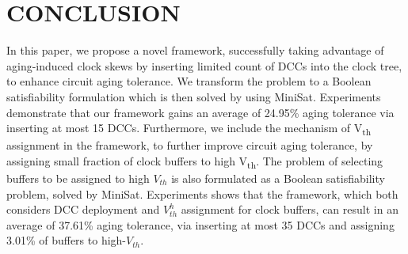 \section{CONCLUSION}
\label{sec:conclude}
In this paper, we propose a novel framework, successfully taking advantage of aging-induced clock skews by inserting limited count of DCCs into the clock tree, to enhance circuit aging tolerance. We transform the problem to a Boolean satisfiability formulation which is then solved by using MiniSat. Experiments demonstrate that our framework gains an average of 24.95\% aging tolerance via inserting at most 15 DCCs. Furthermore, we include the mechanism of V\textsubscript{th} assignment in the framework, to further improve circuit aging tolerance, by assigning small fraction of clock buffers to high V\textsubscript{th}. The problem of selecting buffers to be assigned to high $V_{th}$ is also formulated as a Boolean satisfiability problem, solved by MiniSat. Experiments shows that the framework, which both considers DCC deployment and $V_{th}^h$ assignment for clock buffers, can result in an average of 37.61\% aging tolerance, via inserting at most 35 DCCs and assigning 3.01\% of buffers to high-$V_{th}$.


